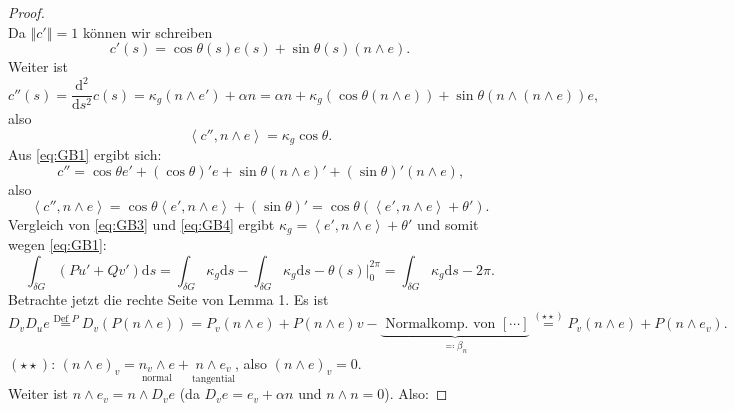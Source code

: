 \begin{theorem}
\begin{proof}
\begin{equation}
    \end{equation}
    Da $ \left\Vert c' \right\Vert = 1 $ können wir schreiben
    \begin{equation}\label{eq:GB2}
      c'(s) = \cos\theta(s)e(s) + \sin\theta(s)(n \wedge e)\text{.}
    \end{equation}
    Weiter ist
    \begin{equation*}
      c''(s) = \frac{\text{d}^2}{\text{d}s^2}c(s) = \kappa_g(n \wedge e') + \alpha n = \alpha n + \kappa_g(\cos\theta(n \wedge e)) + \sin\theta(n \wedge (n \wedge e))e\text{,}
    \end{equation*}
    also
    \begin{equation}\label{eq:GB3}
      \left\langle c'', n \wedge e \right\rangle = \kappa_g\cos\theta\text{.}
    \end{equation}
    Aus \autoref{eq:GB1} ergibt sich:
    \begin{equation*}
      c'' = \cos\theta e' + (\cos\theta)'e + \sin\theta(n \wedge e)' + (\sin\theta)'(n\wedge e)\text{,}
    \end{equation*}
    also
    \begin{equation}\label{eq:GB4}
      \left\langle c'', n \wedge e \right\rangle = \cos\theta \left\langle e', n \wedge e \right\rangle + (\sin\theta)' = \cos\theta\left(\left\langle e', n \wedge e \right\rangle + \theta'\right)\text{.}
    \end{equation}
    Vergleich von \autoref{eq:GB3} und \autoref{eq:GB4} ergibt $ \kappa_g = \left\langle e', n \wedge e \right\rangle + \theta' $ und somit wegen \autoref{eq:GB1}:
    \begin{equation*}
      \int_{\delta G}(Pu' + Qv')\text{d}s = \int_{\delta G}\kappa_g\text{d}s - \int_{\delta G}\kappa_g\text{d}s - \theta(s)\vert_{0}^{2\pi} = \int_{\delta G}\kappa_g\text{d}s - 2\pi\text{.}
    \end{equation*}
    Betrachte jetzt die rechte Seite von Lemma 1. Es ist
    \begin{equation*}
      D_vD_u e \overset{\text{Def }P}{=}D_v(P(n \wedge e)) = P_v(n \wedge e) + P(n\wedge e)v - \underbrace{\text{ Normalkomp. von } [\cdots]}_{\eqqcolon \beta_n} \overset{(\star\star)}{=} P_v(n \wedge e) + P(n \wedge e_v)\text{.}
    \end{equation*}
    $ (\star\star) $: $ (n\wedge e)_v = \underset{\text{normal}}{n_v \wedge e} + \underset{\text{tangential}}{n \wedge e_v} $, also $ (n \wedge e)_v = 0 $. \\
    Weiter ist $ n \wedge e_v = n \wedge D_v e $ (da $ D_ve = e_v + \alpha n $ und $ n \wedge n = 0 $). Also:

\end{proof}
\end{theorem}
